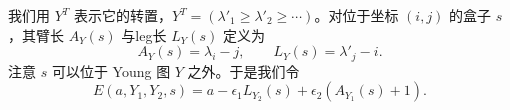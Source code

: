 
我们用 $Y^T$ 表示它的转置，$Y^T=(\lambda'_1\ge\lambda'_2\ge\cdots)$。对位于坐标 $(i,j)$ 的盒子 $s$，其臂长 $A_Y(s)$ 与leg长 $L_Y(s)$ 定义为
\begin{equation}
A_Y(s)=\lambda_i-j,\qquad L_Y(s)=\lambda'_j-i.
\tag{4.20}
\end{equation}
注意 $s$ 可以位于 Young 图 $Y$ 之外。于是我们令
\begin{equation}
E(a,Y_1,Y_2,s)=a-\epsilon_1L_{Y_2}(s)+\epsilon_2(A_{Y_1}(s)+1).
\tag{4.21}
\end{equation}

